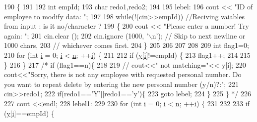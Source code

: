 \begin{DoxyCode}
190                       \{
191  
192   \textcolor{keywordtype}{int} empId;
193   \textcolor{keywordtype}{char} redo1,redo2;
194  
195 lebel:
196   cout << \textcolor{stringliteral}{"ID of employee to modify data: "};
197  
198   \textcolor{keywordflow}{while}(!(cin>>empId))  \textcolor{comment}{//Reciving vaiables from input : is it no/character ?}
199   \{
200     cout << \textcolor{stringliteral}{"Please  enter a number!  Try again: "};
201     cin.clear ();
202     cin.ignore (1000, \textcolor{charliteral}{'\(\backslash\)n'});  \textcolor{comment}{// Skip to next newline or 1000 chars,}
203     \textcolor{comment}{// whichever comes first.}
204   \}
205  
206  
207  
208  
209   \textcolor{keywordtype}{int} flag1=0;
210   \textcolor{keywordflow}{for} (\textcolor{keywordtype}{int} \hyperlink{HumanResources_8cpp_acb559820d9ca11295b4500f179ef6392}{i} = 0; \hyperlink{HumanResources_8cpp_acb559820d9ca11295b4500f179ef6392}{i} < \hyperlink{HumanResources_8cpp_a76f11d9a0a47b94f72c2d0e77fb32240}{n}; ++\hyperlink{HumanResources_8cpp_acb559820d9ca11295b4500f179ef6392}{i}) \{
211  
212     \textcolor{keywordflow}{if} (\hyperlink{HumanResources_8cpp_a76e44bc53d2efde76380be19dc9ebbc3}{y}[\hyperlink{HumanResources_8cpp_acb559820d9ca11295b4500f179ef6392}{i}]!=empId) \{
213       flag1++;
214  
215     \}
216   \}
217   \textcolor{comment}{/*  if (flag1==n)\{}
218 \textcolor{comment}{ }
219 \textcolor{comment}{                         // cout<<" not     matching="<< y[i];}
220 \textcolor{comment}{cout<<"Sorry, there is not any employee with requested personal number. Do you want to repeat delete by
       entering the new personal number (y/n)?:";}
221 \textcolor{comment}{                     cin>>redo1;}
222 \textcolor{comment}{                          if(redo1=='Y'||redo1=='y')\{}
223 \textcolor{comment}{                          goto lebel;}
224 \textcolor{comment}{                            \}}
225 \textcolor{comment}{                          \} */}
226  
227   cout <<endl;
228 lebel1:
229  
230   \textcolor{keywordflow}{for} (\textcolor{keywordtype}{int} \hyperlink{HumanResources_8cpp_acb559820d9ca11295b4500f179ef6392}{i} = 0; \hyperlink{HumanResources_8cpp_acb559820d9ca11295b4500f179ef6392}{i} < \hyperlink{HumanResources_8cpp_a76f11d9a0a47b94f72c2d0e77fb32240}{n}; ++\hyperlink{HumanResources_8cpp_acb559820d9ca11295b4500f179ef6392}{i}) \{
231  
232  
233     \textcolor{keywordflow}{if} (\hyperlink{HumanResources_8cpp_a76e44bc53d2efde76380be19dc9ebbc3}{y}[\hyperlink{HumanResources_8cpp_acb559820d9ca11295b4500f179ef6392}{i}]==empId) \{

\end{DoxyCode}
